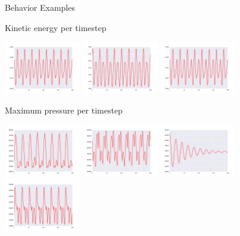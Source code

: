 \documentclass{beamer}
\begin{document}
\begin{frame}[allowframebreaks]{Behavior Examples}
\begin{minipage}{\textwidth}
\begin{block}{Kinetic energy per timestep}
\begin{center}
\includegraphics[width=0.25\textwidth]{figures/behaviors/51.pdf}
\includegraphics[width=0.25\textwidth]{figures/behaviors/52.pdf}
\includegraphics[width=0.25\textwidth]{figures/behaviors/53.pdf}
\end{center}
\end{block}
\end{minipage}

\begin{minipage}{\textwidth}
\begin{block}{Maximum pressure per timestep}
\begin{center}
\includegraphics[width=0.25\textwidth]{figures/behaviors/60.pdf}
\includegraphics[width=0.25\textwidth]{figures/behaviors/61.pdf}
\includegraphics[width=0.25\textwidth]{figures/behaviors/62.pdf}
\includegraphics[width=0.25\textwidth]{figures/behaviors/63.pdf}
\end{center}
\end{block}
\end{minipage}

\end{frame}
\end{document}

